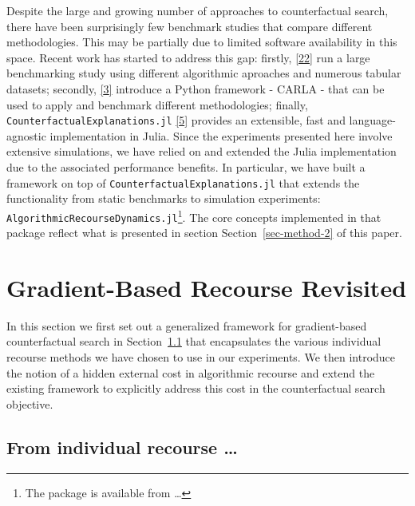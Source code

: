 \documentclass[
  conference]{IEEEtran}
\begin{document}
Despite the large and growing number of approaches to counterfactual
search, there have been surprisingly few benchmark studies that compare
different methodologies. This may be partially due to limited software
availability in this space. Recent work has started to address this gap:
firstly, \protect\hyperlink{ref-de2021framework}{{[}22{]}} run a large
benchmarking study using different algorithmic aproaches and numerous
tabular datasets; secondly,
\protect\hyperlink{ref-pawelczyk2021carla}{{[}3{]}} introduce a Python
framework - CARLA - that can be used to apply and benchmark different
methodologies; finally, \texttt{CounterfactualExplanations.jl}
\protect\hyperlink{ref-altmeyer2022CounterfactualExplanations}{{[}5{]}}
provides an extensible, fast and language-agnostic implementation in
Julia. Since the experiments presented here involve extensive
simulations, we have relied on and extended the Julia implementation due
to the associated performance benefits. In particular, we have built a
framework on top of \texttt{CounterfactualExplanations.jl} that extends
the functionality from static benchmarks to simulation experiments:
\texttt{AlgorithmicRecourseDynamics.jl}\footnote{The package is
  available from \ldots{}}. The core concepts implemented in that
package reflect what is presented in section Section~\ref{sec-method-2}
of this paper.

\hypertarget{sec-method}{%
\section{Gradient-Based Recourse Revisited}\label{sec-method}}

In this section we first set out a generalized framework for
gradient-based counterfactual search in Section~\ref{sec-method-general}
that encapsulates the various individual recourse methods we have chosen
to use in our experiments. We then introduce the notion of a hidden
external cost in algorithmic recourse and extend the existing framework
to explicitly address this cost in the counterfactual search objective.

\hypertarget{sec-method-general}{%
\subsection{From individual recourse
\ldots{}}\label{sec-method-general}}
\end{document}
